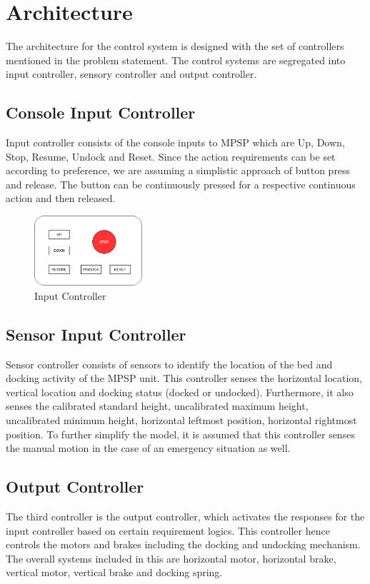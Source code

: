 \label{task4}
\section{Architecture}
The architecture for the control system is designed with the set of controllers mentioned in the problem statement. The control systems are segregated into input controller, sensory controller and output controller. 
\subsection{Console Input Controller}
Input controller consists of the console inputs to MPSP which are Up, Down, Stop, Resume, Undock and Reset. Since the action requirements can be set according to preference, we are assuming a simplistic approach of button press and release. The button can be continuously pressed for a respective continuous action and then released.

\begin{figure}[htp]
    \centering
    \includegraphics[width=4cm]{chapters/images/Console.png}
    \caption{Input Controller}
    \label{fig:inputController}
\end{figure}

\subsection{Sensor Input Controller}
Sensor controller consists of sensors to identify the location of the bed and docking activity of the MPSP unit. This controller senses the horizontal location, vertical location and docking status (docked or undocked).  Furthermore, it also senses the calibrated standard height, uncalibrated maximum height, uncalibrated minimum height, horizontal leftmost position, horizontal rightmost position. To further simplify the model, it is assumed that this controller senses the manual motion in the case of an emergency situation as well.

\subsection{Output Controller}
The third controller is the output controller, which activates the responses for the input controller based on certain requirement logics. This controller hence controls the motors and brakes including the docking and undocking mechanism. The overall  systems included in this are horizontal motor, horizontal brake, vertical motor, vertical brake and docking spring.


